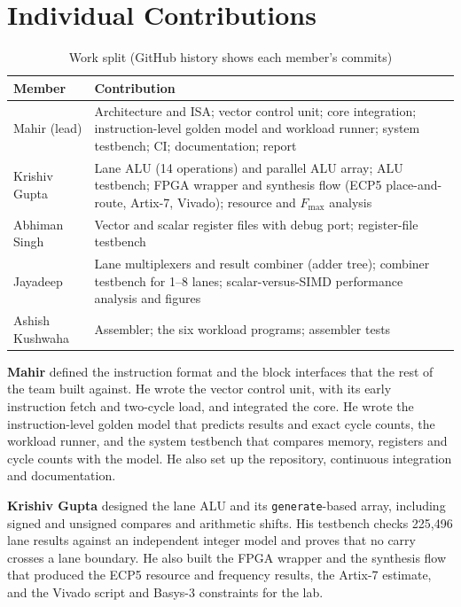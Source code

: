 \documentclass[conference]{IEEEtran}
\begin{document}
\section{Individual Contributions}

\begin{table}[h]
\centering
\caption{Work split (GitHub history shows each member's commits)}
\label{tab:contrib}
\begin{tabular}{p{}p{}}
\toprule
Member & Contribution \\
\midrule
Mahir (lead) & Architecture and ISA; vector control unit; core integration; instruction-level golden model and workload runner; system testbench; CI; documentation; report \\
Krishiv Gupta & Lane ALU (14 operations) and parallel ALU array; ALU testbench; FPGA wrapper and synthesis flow (ECP5 place-and-route, Artix-7, Vivado); resource and $F_{\max}$ analysis \\
Abhiman Singh & Vector and scalar register files with debug port; register-file testbench \\
Jayadeep & Lane multiplexers and result combiner (adder tree); combiner testbench for 1--8 lanes; scalar-versus-SIMD performance analysis and figures \\
Ashish Kushwaha & Assembler; the six workload programs; assembler tests \\
\bottomrule
\end{tabular}
\end{table}

\textbf{Mahir} defined the instruction format and the block interfaces that the rest
of the team built against. He wrote the vector control unit, with its early
instruction fetch and two-cycle load, and integrated the core. He wrote the
instruction-level golden model that predicts results and exact cycle counts, the
workload runner, and the system testbench that compares memory, registers and cycle
counts with the model. He also set up the repository, continuous integration and
documentation.

\textbf{Krishiv Gupta} designed the lane ALU and its \texttt{generate}-based array,
including signed and unsigned compares and arithmetic shifts. His testbench checks
225,496 lane results against an independent integer model and proves that no carry
crosses a lane boundary. He also built the FPGA wrapper and the synthesis flow that
produced the ECP5 resource and frequency results, the Artix-7 estimate, and the
Vivado script and Basys-3 constraints for the lab.
\end{document}
